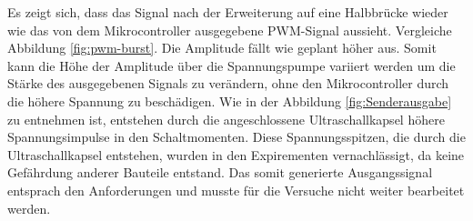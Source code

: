 Es zeigt sich, dass das Signal nach der Erweiterung auf eine Halbbrücke wieder wie das von dem Mikrocontroller ausgegebene PWM-Signal aussieht. Vergleiche Abbildung \ref{fig:pwm-burst}. Die Amplitude fällt wie geplant höher aus. Somit kann die Höhe der Amplitude über die Spannungspumpe variiert werden um die Stärke des ausgegebenen Signals zu verändern, ohne den Mikrocontroller durch die höhere Spannung zu beschädigen. Wie in der Abbildung \ref{fig:Senderausgabe} zu entnehmen ist, entstehen durch die angeschlossene Ultraschallkapsel höhere Spannungsimpulse in den Schaltmomenten. Diese Spannungsspitzen, die durch die Ultraschallkapsel entstehen, wurden in den Expirementen vernachlässigt, da keine Gefährdung anderer Bauteile entstand. Das somit generierte Ausgangssignal entsprach den Anforderungen und musste für die Versuche nicht weiter bearbeitet werden.
